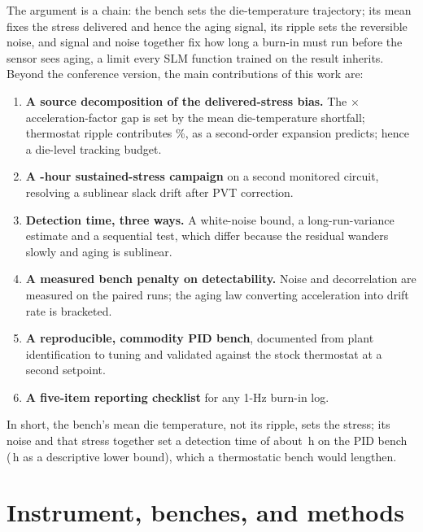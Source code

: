 \documentclass[10pt,twocolumn]{article}
\begin{document}
The argument is a chain: the bench sets the die-temperature trajectory; its mean fixes the stress delivered and hence the aging signal, its ripple sets the reversible noise, and signal and noise together fix how long a burn-in must run before the sensor sees aging, a limit every SLM function trained on the result inherits. Beyond the conference version, the main contributions of this work are:
\begin{enumerate}
\item \textbf{A source decomposition of the delivered-stress bias.} The \vAFratio$\times$ acceleration-factor gap is set by the mean die-temperature shortfall; thermostat ripple contributes \vRippleBB\%, as a second-order expansion predicts; hence a die-level tracking budget.
\item \textbf{A \vDurRCA-hour sustained-stress campaign} on a second monitored circuit, resolving a sublinear slack drift after PVT correction.
\item \textbf{Detection time, three ways.} A white-noise bound, a long-run-variance estimate and a sequential test, which differ because the residual wanders slowly and aging is sublinear.
\item \textbf{A measured bench penalty on detectability.} Noise and decorrelation are measured on the paired runs; the aging law converting acceleration into drift rate is bracketed.
\item \textbf{A reproducible, commodity PID bench}, documented from plant identification to tuning and validated against the stock thermostat at a second setpoint.
\item \textbf{A five-item reporting checklist} for any 1-Hz burn-in log.
\end{enumerate}

In short, the bench's mean die temperature, not its ripple, sets the stress; its noise and that stress together set a detection time of about \vTminLrv\,h on the PID bench (\vTminSeq\,h as a descriptive lower bound), which a thermostatic bench would lengthen.

\section{Instrument, benches, and methods}
\end{document}
